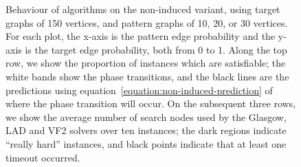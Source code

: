 \documentclass[twoside,11pt]{article}
\begin{document}
\begin{figure}[tb]

    \caption{Behaviour of algorithms on the non-induced variant, using target graphs of 150
        vertices, and pattern graphs of 10, 20, or 30 vertices. For each plot, the x-axis is the
        pattern edge probability and the y-axis is the target edge probability, both from 0 to 1.
        Along the top row, we show the proportion of instances which are satisfiable; the white
        bands show the phase transitions, and the black lines are the predictions using
        equation~\eqref{equation:non-induced-prediction} of where the phase transition will occur.
        On the subsequent three rows, we show the average number of search nodes used by the
        Glasgow, LAD and VF2 solvers over ten instances; the dark regions indicate ``really hard''
        instances, and black
        points indicate that at least one timeout occurred.}
    \label{figure:non-induced}
\end{figure}
\end{document}
